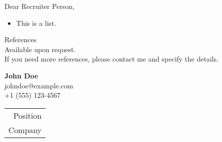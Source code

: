 \documentclass[a4paper,12pt]{article} %
\begin{document}
\pagestyle{fancy}
\fancyhf{}
\renewcommand{\headrulewidth}{1pt}
\setlength{\footskip}{20pt}

\vspace{12pt}
\vspace{12pt}

\begin{center}
    Dear Recruiter Person,
\end{center}

\vspace{12pt}
\vspace{12pt}

\lipsum[1-2]

\vspace{12pt}

\lipsum[1-2]

\begin{itemize}
    \item This is a list.
\end{itemize}

\noindent References \\
Available upon request. \\
If you need more references, please contact me and specify the details.


\vspace*{\fill}

\begin{center}
    \begin{minipage}{0.6\textwidth}
        \begin{flushleft}
            \textbf{John Doe}\\
            johndoe@example.com\\
            +1 (555) 123-4567
        \end{flushleft}
    \end{minipage}%
    \begin{minipage}{0.4\textwidth}
        \begin{flushright}
            \begin{tabular}{@{}r@{}}
                \\
                Position \\
                Company
            \end{tabular}
        \end{flushright}
    \end{minipage}
\end{center}
\end{document}
